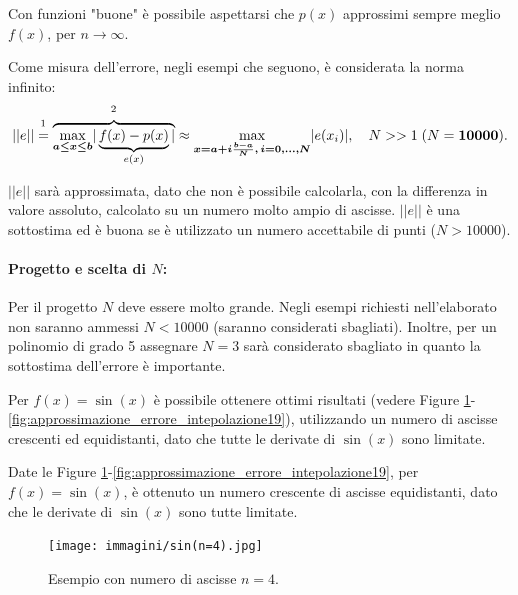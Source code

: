 Con funzioni "buone" è possibile aspettarsi che $p(x)$ approssimi sempre meglio $f(x)$, per $n\rightarrow\infty$.

Come misura dell'errore, negli esempi che seguono, è considerata la norma infinito:
\begin{equation*}
    ||e||\overset{\footnotemark}{=} \overbrace{\underset{\boldsymbol{a\leq x\leq b}}{\max}|\underbrace{f(x)-p(x)}_{e(x)}|}^{\footnotemark}\approx \underset{\boldsymbol{x=a+i\frac{b-a}{N},\, i=0,\hdots,N}}{\max}|e(x_i)|,\quad N>>1\; (N=\boldsymbol{10000}).
\end{equation*}
\addtocounter{footnote}{-1}

$||e||$ sarà approssimata, dato che non è possibile calcolarla, con la differenza in valore assoluto, calcolato su un numero molto ampio di ascisse. $||e||$ è una sottostima ed è buona se è utilizzato un numero accettabile di punti ($N>10000$).

\paragraph{Progetto e scelta di $N$:} Per il progetto $N$ deve essere molto grande. Negli esempi richiesti nell'elaborato non saranno ammessi $N<10000$ (saranno considerati sbagliati). Inoltre, per un polinomio di grado 5 assegnare $N=3$ sarà considerato sbagliato in quanto la sottostima dell'errore è importante.

\begin{example}
    Per $f(x)=\sin(x)$ è possibile ottenere ottimi risultati (vedere Figure \ref{fig:approxErrIntepolaz4}-\ref{fig:approssimazione_errore_intepolazione19}), utilizzando un numero di ascisse crescenti ed equidistanti, dato che tutte le derivate di $\sin(x)$ sono limitate.

    Date le Figure \ref{fig:approxErrIntepolaz4}-\ref{fig:approssimazione_errore_intepolazione19}, per $f(x)=\sin(x)$, è ottenuto un numero crescente di ascisse equidistanti, dato che le derivate di $\sin(x)$ sono tutte limitate.
\end{example}

\begin{figure}%
\centering
\texttt{[image: immagini/sin(n=4).jpg]}
\caption{Esempio con numero di ascisse $n=4$.}\label{fig:approxErrIntepolaz4}
\end{figure}

